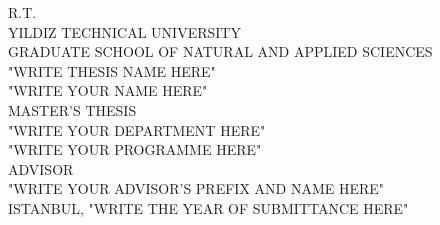 \documentclass[12pt]{report}
\begin{document}
\begin{titlepage}
\begin{center}
\begin{singlespacing}
\uppercase{\large R.T.\\ YILDIZ TECHNICAL UNIVERSITY\\ GRADUATE SCHOOL OF NATURAL AND APPLIED SCIENCES}\\[4cm]
\uppercase{\large "WRITE THESIS NAME HERE"}\\[5cm]
\uppercase{\large "WRITE YOUR NAME HERE"}\\[3cm]
\uppercase{\large MASTER'S THESIS\\ "WRITE YOUR DEPARTMENT HERE"\\ "WRITE YOUR PROGRAMME HERE"}\\[3cm] %
\uppercase{\large ADVISOR\\ "WRITE YOUR ADVISOR'S PREFIX AND NAME HERE"}\\[2cm]
\uppercase{\large ISTANBUL, "WRITE THE YEAR OF SUBMITTANCE HERE"}
\end{singlespacing}
\end{center}
\end{titlepage}
\restoregeometry
\end{document}
